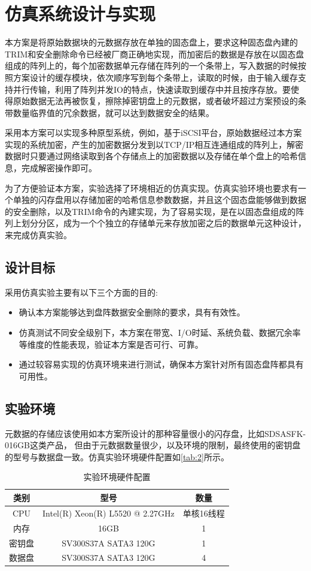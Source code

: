 \chapter{仿真系统设计与实现}
本方案是将原始数据块的元数据存放在单独的固态盘上，要求这种固态盘內建的TRIM和安全删除命令已经被厂商正确地实现，而加密后的数据是存放在以固态盘组成的阵列上的，每个加密数据单元存储在阵列的一个条带上，写入数据的时候按照方案设计的缓存模块，依次顺序写到每个条带上，读取的时候，由于输入缓存支持并行传输，利用了阵列并发IO的特点，快速读取到缓存中并且按序存放。要使得原始数据无法再被恢复，擦除掉密钥盘上的元数据，或者破坏超过方案预设的条带数量临界值的冗余数据，就可以达到数据安全的结果。


采用本方案可以实现多种原型系统，例如，基于iSCSI平台，原始数据经过本方案实现的系统加密，产生的加密数据分发到以TCP/IP相互连通组成的阵列上，解密数据时只要通过网络读取到各个存储点上的加密数据以及存储在单个盘上的哈希信息，完成解密操作即可。


为了方便验证本方案，实验选择了环境相近的仿真实现。仿真实验环境也要求有一个单独的闪存盘用以存储加密的哈希信息参数数据，并且这个固态盘能够做到数据的安全删除，以及TRIM命令的內建实现，为了容易实现，是在以固态盘组成的阵列上划分分区，成为一个个独立的存储单元来存放加密之后的数据单元这种设计，来完成仿真实验。
\section{设计目标}
采用仿真实验主要有以下三个方面的目的:
\begin{itemize}
	\item 确认本方案能够达到盘阵数据安全删除的要求，具有有效性。
	\item 仿真测试不同安全级别下，本方案在带宽、I/O时延、系统负载、数据冗余率等维度的性能表现，验证本方案是否可行、可靠。
	\item 通过较容易实现的仿真环境来进行测试，确保本方案针对所有固态盘阵都具有可用性。
\end{itemize}
\section{实验环境}
元数据的存储应该使用如本方案所设计的那种容量很小的闪存盘，比如SDSASFK-016GB这类产品，
但由于元数据数量很少，以及环境的限制，最终使用的密钥盘的型号与数据盘一致。仿真实验环境硬件配置如\autoref{tab:2}所示。
\begin{table}[H]
    \centering
    \caption{实验环境硬件配置}
    \label{tab:2}
    \begin{tabular}{|c|c|c|}
        \hline
        类别 & 型号 & 数量 \\ \hline
        CPU & Intel(R) Xeon(R) L5520  @ 2.27GHz & 单核16线程 \\ \hline
        内存 & 16GB & 1 \\ \hline
        密钥盘 & SV300S37A SATA3 120G & 1 \\ \hline
        数据盘 & SV300S37A SATA3 120G & 4 \\ \hline
    \end{tabular}
\end{table}
